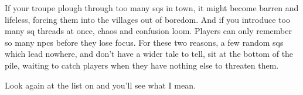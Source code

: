 If your troupe plough through too many \glspl{sq} in town, it might become barren and lifeless, forcing them into the \glspl{village} out of boredom.
And if you introduce too many \gls{sq} threads at once, chaos and confusion loom.
Players can only remember so many \glspl{npc} before they lose focus.
For these two reasons, a few random \glspl{sq} which lead nowhere, and don't have a wider tale to tell, sit at the bottom of the pile, waiting to catch players when they have nothing else to threaten them.

Look again at the list on  and you'll see what I mean.
